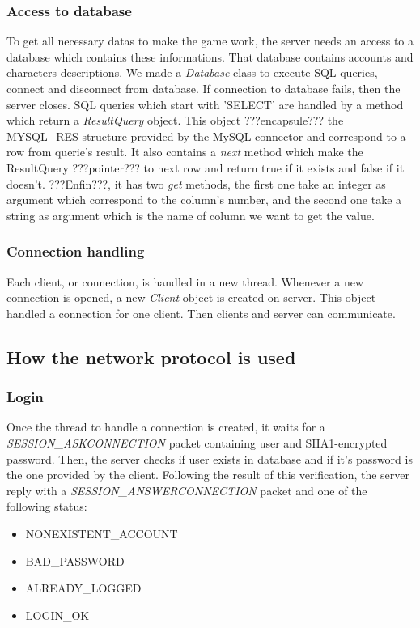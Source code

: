 \documentclass{scrreprt}
\begin{document}
				\subsubsection{Access to database}
				To get all necessary datas to make the game work, the server needs an access to a database which contains these informations. That database contains accounts and characters descriptions. We made a \emph{Database} class to execute SQL queries, connect and disconnect from database. If connection to database fails, then the server closes. SQL queries which start with 'SELECT' are handled by a method which return a \emph{ResultQuery} object. This object ???encapsule??? the MYSQL\_RES structure provided by the MySQL connector and correspond to a row from querie's result. It also contains a \emph{next} method which make the ResultQuery ???pointer??? to next row and return true if it exists and false if it doesn't. ???Enfin???, it has two \emph{get} methods, the first one take an integer as argument which correspond to the column's number, and the second one take a string as argument which is the name of column we want to get the value.
				\subsubsection{Connection handling}
				Each client, or connection, is handled in a new thread. Whenever a new connection is opened, a new \emph{Client} object is created on server. This object handled a connection for one client. Then clients and server can communicate.

				\subsection{How the network protocol is used}
				\subsubsection{Login}
				Once the thread to handle a connection is created, it waits for a \emph{SESSION\_ASKCONNECTION} packet containing user and SHA1-encrypted password. Then, the server checks if user exists in database and if it's password is the one provided by the client. Following the result of this verification, the server reply with a \emph{SESSION\_ANSWERCONNECTION} packet and one of the following status:
				\begin{itemize}
				\item{NONEXISTENT\_ACCOUNT}
				\item{BAD\_PASSWORD}
				\item{ALREADY\_LOGGED}
				\item{LOGIN\_OK}
				\end{itemize}
\end{document}
